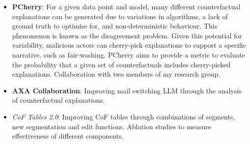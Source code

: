 \begin{itemize}
    \item \textbf{PCherry}: For a given data point and model, many different counterfactual explanations can be 
    generated due to variations in algorithms, a lack of ground truth to optimise for, and non-deterministic behaviour.
    This phenomenon is known as the disagreement problem. Given this potential for variability, malicious actors can 
    cherry-pick explanations to support a specific narrative, such as fair-washing.
    PCherry aims to provide a metric to evaluate the probability that a given set of counterfactuals includes
    cherry-picked explanations. Collaboration with two members of my research group.
    \item \textbf{AXA Collaboration}: Improving mail switching LLM through the analysis of counterfactual explanations.
    \item \textit{CoF Tables 2.0}: Improving CoF tables through combinations of segments, 
    new segmentation and edit functions. Ablation studies to measure effectiveness of different components.
\end{itemize}